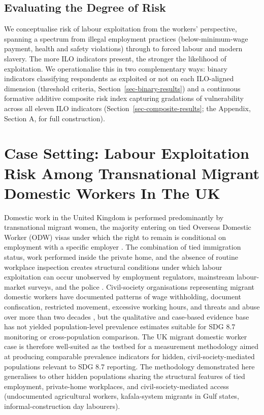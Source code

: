 \documentclass[
  12pt,
  letterpaper,
  DIV=11,
  numbers=noendperiod]{scrartcl}
\begin{document}
\subsection{Evaluating the Degree of Risk}\label{sec-degree-of-risk}

We conceptualise risk of labour exploitation from the workers'
perspective, spanning a spectrum from illegal employment practices
(below-minimum-wage payment, health and safety violations) through to
forced labour and modern slavery. The more ILO indicators present, the
stronger the likelihood of exploitation. We operationalise this in two
complementary ways: binary indicators classifying respondents as
exploited or not on each ILO-aligned dimension (threshold criteria,
Section~\ref{sec-binary-results}) and a continuous formative additive
composite risk index capturing gradations of vulnerability across all
eleven ILO indicators (Section~\ref{sec-composite-results}; the
Appendix, Section A, for full construction).

\section{Case Setting: Labour Exploitation Risk Among Transnational
Migrant Domestic Workers In The UK}\label{sec-case-setting}

Domestic work in the United Kingdom is performed predominantly by
transnational migrant women, the majority entering on tied Overseas
Domestic Worker (ODW) visas under which the right to remain is
conditional on employment with a specific employer
\autocite{mant16-modern,kala08-new,serv23-closed}. The combination of
tied immigration status, work performed inside the private home, and the
absence of routine workplace inspection creates structural conditions
under which labour exploitation can occur unobserved by employment
regulators, mainstream labour-market surveys, and the police
\autocite{romero_blueprint_2025}. Civil-society organisations
representing migrant domestic workers have documented patterns of wage
withholding, document confiscation, restricted movement, excessive
working hours, and threats and abuse over more than two decades
\autocite{kala08-new,mant16-modern,serv23-closed,yilm23-exploring}, but
the qualitative and case-based evidence base has not yielded
population-level prevalence estimates suitable for SDG 8.7 monitoring or
cross-population comparison. The UK migrant domestic worker case is
therefore well-suited as the testbed for a measurement methodology aimed
at producing comparable prevalence indicators for hidden,
civil-society-mediated populations relevant to SDG 8.7 reporting. The
methodology demonstrated here generalises to other hidden populations
sharing the structural features of tied employment, private-home
workplaces, and civil-society-mediated access (undocumented agricultural
workers, kafala-system migrants in Gulf states, informal-construction
day labourers).
\end{document}
